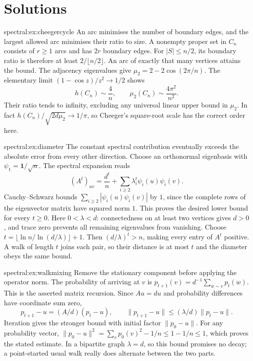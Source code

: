 \section{Solutions}
\begin{solution}{spectral:ex:cheegercycle}
\idea An arc minimises the number of boundary edges, and the largest allowed arc minimises their ratio to size.
\writeup A nonempty proper set in $C_n$ consists of $r\ge1$ arcs and has $2r$ boundary edges. For $|S|\le n/2$, its boundary ratio is therefore at least $2/\lfloor n/2\rfloor$. An arc of exactly that many vertices attains the bound. The adjacency eigenvalues give $\mu_2=2-2\cos(2\pi/n)$. The elementary limit $(1-\cos z)/z^2\to1/2$ shows
\[
h(C_n)\sim\frac4n,\qquad \mu_2(C_n)\sim\frac{4\pi^2}{n^2}.
\]
Their ratio tends to infinity, excluding any universal linear upper bound in $\mu_2$. In fact $h(C_n)/\sqrt{2d\mu_2}\to1/\pi$, so Cheeger's square-root scale has the correct order here.
\end{solution}
\begin{solution}{spectral:ex:diameter}
\idea The constant spectral contribution eventually exceeds the absolute error from every other direction.
\writeup Choose an orthonormal eigenbasis with $\psi_1=\mathbf1/\sqrt n$. The spectral expansion reads
\[
(A^t)_{uv}=\frac{d^t}{n}+\sum_{i\ge2}\lambda_i^t\psi_i(u)\psi_i(v).
\]
Cauchy--Schwarz bounds $\sum_{i\ge2}|\psi_i(u)\psi_i(v)|$ by $1$, since the complete rows of the eigenvector matrix have squared norm $1$. This proves the desired lower bound for every $t\ge0$. Here $0<\lambda<d$: connectedness on at least two vertices gives $d>0$, and trace zero prevents all remaining eigenvalues from vanishing. Choose
$t=\lfloor\ln n/\ln(d/\lambda)\rfloor+1$.
Then $(d/\lambda)^t>n$, making every entry of $A^t$ positive. A walk of length $t$ joins each pair, so their distance is at most $t$ and the diameter obeys the same bound.
\end{solution}
\begin{solution}{spectral:ex:walkmixing}
\idea Remove the stationary component before applying the operator norm.
\writeup The probability of arriving at $v$ is $p_{t+1}(v)=d^{-1}\sum_{w\sim v}p_t(w)$. This is the asserted matrix recursion. Since $Au=du$ and probability differences have coordinate sum zero,
\[
p_{t+1}-u=(A/d)(p_t-u),\qquad
\|p_{t+1}-u\|\le(\lambda/d)\|p_t-u\|.
\]
Iteration gives the stronger bound with initial factor $\|p_0-u\|$. For any probability vector,
$\|p_0-u\|^2=\sum_vp_0(v)^2-1/n\le1-1/n\le1$,
which proves the stated estimate. In a bipartite graph $\lambda=d$, so this bound promises no decay; a point-started usual walk really does alternate between the two parts.
\end{solution}
